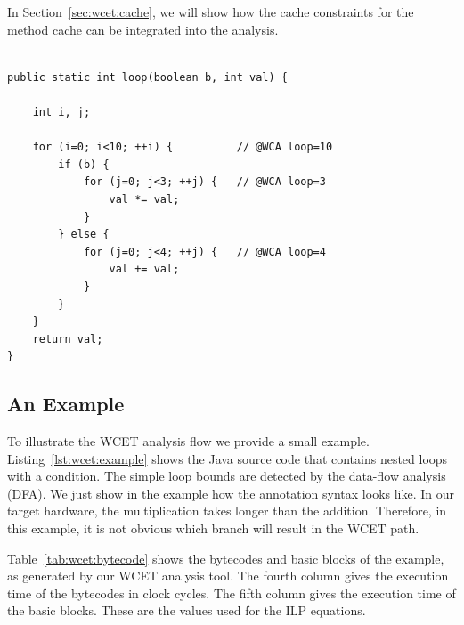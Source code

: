 In Section~\ref{sec:wcet:cache}, we will show how the cache
constraints for the method cache can be integrated into the analysis.



\begin{lstlisting}[float=t, caption={The example used for WCET analysis},label=lst:wcet:example]

public static int loop(boolean b, int val) {

    int i, j;

    for (i=0; i<10; ++i) {          // @WCA loop=10
        if (b) {
            for (j=0; j<3; ++j) {   // @WCA loop=3
                val *= val;
            }
        } else {
            for (j=0; j<4; ++j) {   // @WCA loop=4
                val += val;
            }
        }
    }
    return val;
}
\end{lstlisting}

\subsection{An Example}

To illustrate the WCET analysis flow we provide a small example.
Listing~\ref{lst:wcet:example} shows the Java source code that
contains nested loops with a condition. The simple loop bounds are
detected by the data-flow analysis (DFA). We just show in the example
how the annotation syntax looks like. In our target hardware, the
multiplication takes longer than the addition. Therefore, in this
example, it is not obvious which branch will result in the WCET path.

Table~\ref{tab:wcet:bytecode} shows the bytecodes and basic blocks of
the example, as generated by our WCET analysis tool. The fourth
column gives the execution time of the bytecodes in clock cycles. The
fifth column gives the execution time of the basic blocks. These are
the values used for the ILP equations.

